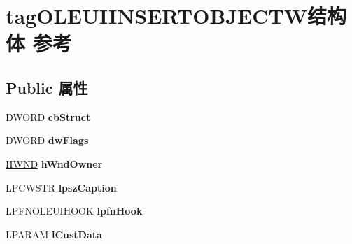 \hypertarget{structtag_o_l_e_u_i_i_n_s_e_r_t_o_b_j_e_c_t_w}{}\section{tag\+O\+L\+E\+U\+I\+I\+N\+S\+E\+R\+T\+O\+B\+J\+E\+C\+T\+W结构体 参考}
\label{structtag_o_l_e_u_i_i_n_s_e_r_t_o_b_j_e_c_t_w}
\subsection*{Public 属性}
\begin{DoxyCompactItemize}
\item 
\mbox{\label{structtag_o_l_e_u_i_i_n_s_e_r_t_o_b_j_e_c_t_w_ada90e577d54869bd21b7b1640edccc59}} 
D\+W\+O\+RD {\bfseries cb\+Struct}
\item 
\mbox{\label{structtag_o_l_e_u_i_i_n_s_e_r_t_o_b_j_e_c_t_w_a43b25e9949bb71bbe07604ab6bd82f86}} 
D\+W\+O\+RD {\bfseries dw\+Flags}
\item 
\mbox{\label{structtag_o_l_e_u_i_i_n_s_e_r_t_o_b_j_e_c_t_w_a05138beba6501565817693601a1e391a}} 
\hyperlink{interfacevoid}{H\+W\+ND} {\bfseries h\+Wnd\+Owner}
\item 
\mbox{\label{structtag_o_l_e_u_i_i_n_s_e_r_t_o_b_j_e_c_t_w_a627d6e8c0c868d174c33b78290685824}} 
L\+P\+C\+W\+S\+TR {\bfseries lpsz\+Caption}
\item 
\mbox{\label{structtag_o_l_e_u_i_i_n_s_e_r_t_o_b_j_e_c_t_w_a35c6f52b56c559c2c8ea415185b7e5ae}} 
L\+P\+F\+N\+O\+L\+E\+U\+I\+H\+O\+OK {\bfseries lpfn\+Hook}
\item 
\mbox{\label{structtag_o_l_e_u_i_i_n_s_e_r_t_o_b_j_e_c_t_w_a23f528bac90319ada64f0ffa7d762508}} 
L\+P\+A\+R\+AM {\bfseries l\+Cust\+Data}
\item 
\mbox{\label{structtag_o_l_e_u_i_i_n_s_e_r_t_o_b_j_e_c_t_w_a1ade99e37ac275ef0534d211be5f1774}} 

\end{DoxyCompactItemize}
